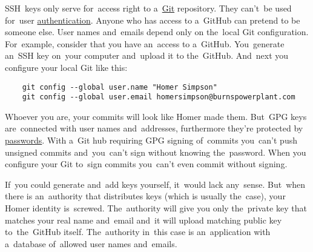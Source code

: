 \label{gitgpg}
SSH~keys only serve for~access right to a~\hyperref[git]{Git} repository.
They can't~be used for~user \hyperref[authenticationauthorization]{authentication}.
Anyone who has access to a~GitHub can pretend to be someone else.
User names and~emails depend only on the~local Git configuration.
For~example, consider that you have an~access to a~GitHub.
You~generate an~SSH key on~your computer and~upload it to the~GitHub.
And~next you configure your local Git like this:
\begin{lstlisting}
    git config --global user.name "Homer Simpson"
    git config --global user.email homersimpson@burnspowerplant.com
\end{lstlisting}
\noindent Whoever you are, your commits will look like Homer made them.
But~GPG keys are~connected with user names and~addresses, furthermore they're protected by \hyperref[keypassword]{passwords}.
With a~Git hub requiring GPG signing of~commits you~can't push unsigned commits and~you~can't sign without knowing the~password.
When you configure your Git to~sign commits you~can't even commit without signing.

If~you could generate and~add keys yourself, it~would lack any~sense.
But~when there is an~authority that distributes keys (which is usually the~case), your Homer identity is~screwed.
The~authority will give you only the~private key that matches your real name and~email and~it will upload matching public key to~the~GitHub itself.
The~authority in~this case is an~application with a~database of~allowed user names and~emails.
